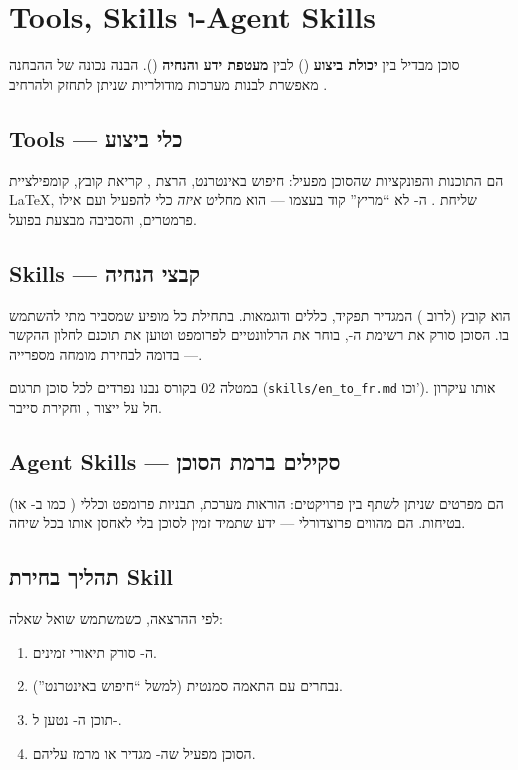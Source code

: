 \section{Tools, Skills ו-Agent Skills}

סוכן  מבדיל בין \textbf{יכולת ביצוע} () לבין \textbf{מעטפת
ידע והנחיה} (). הבנה נכונה של ההבחנה מאפשרת לבנות מערכות מודולריות
שניתן לתחזק ולהרחיב \cite{yao2023react,openai2024agents}.

\subsection{Tools --- כלי ביצוע}

 הם התוכנות והפונקציות שהסוכן מפעיל: חיפוש באינטרנט, הרצת
, קריאת קובץ, קומפילציית \LaTeX{}, שליחת . ה-
לא ``מריץ'' קוד בעצמו --- הוא מחליט \emph{איזה} כלי להפעיל ועם אילו פרמטרים,
והסביבה מבצעת בפועל.

\subsection{Skills --- קבצי הנחיה}

 הוא קובץ (לרוב ) המגדיר תפקיד, כללים ודוגמאות.
בתחילת כל  מופיע  שמסביר מתי להשתמש בו. הסוכן
סורק את רשימת ה-, בוחר את הרלוונטיים לפרומפט וטוען את תוכנם
לחלון ההקשר --- בדומה לבחירת מומחה מספרייה.

\begin{notebox}
במטלה 02 בקורס נבנו  נפרדים לכל סוכן תרגום
(\texttt{skills/en\_to\_fr.md} וכו'). אותו עיקרון חל על ייצור ,
 וחקירת סייבר.
\end{notebox}

\subsection{Agent Skills --- סקילים ברמת הסוכן}

 (כמו ב- או ) הם מפרטים שניתן
לשתף בין פרויקטים: הוראות מערכת, תבניות פרומפט וכללי בטיחות. הם מהווים
 פרוצדורלי --- ידע שתמיד זמין לסוכן בלי לאחסן אותו בכל שיחה.

\subsection{תהליך בחירת Skill}

לפי ההרצאה, כשמשתמש שואל שאלה:
\begin{enumerate}[rightmargin=2em]
  \item ה- סורק תיאורי  זמינים.
  \item נבחרים  עם התאמה סמנטית (למשל ``חיפוש באינטרנט'').
  \item תוכן ה- נטען ל-.
  \item הסוכן מפעיל  שה- מגדיר או מרמז עליהם.
\end{enumerate}

